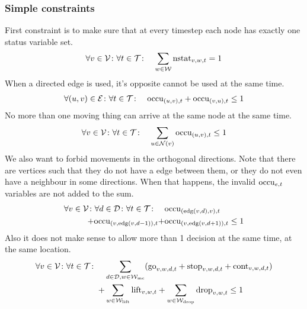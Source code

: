 \subsubsection{Simple constraints}
\label{sec:simple}
First constraint is to make sure that at every timestep each node has exactly
one status variable set.
\begin{align}
    &\forall v \in \mathcal{V} \colon \forall t \in \mathcal{T} \colon & \sum_{w \in \mathcal{W}}
    \mathrm{nstat}_{v,w,t} = 1
\end{align}
When a directed edge is used, it's opposite cannot be used at the same time.
\begin{align}
    &\forall (u,v) \in \mathcal{E} \colon \forall t \in \mathcal{T} \colon & \mathrm{occu}_{(u,v),t} +
    \mathrm{occu}_{(v,u),t} \leq 1
\end{align}
No more than one moving thing can arrive at the same node at the same time.
\begin{align}
    &\forall v \in \mathcal{V} \colon \forall t \in \mathcal{T} \colon & \sum_{u \in \mathcal{N}(v)}
    \mathrm{occu}_{(u,v),t} \leq 1
\end{align}
We also want to forbid movements in the orthogonal directions.  Note that there
are vertices such that they do not have a edge between them, or they do
not even have a neighbour in some directions. When that happens, the invalid
$\mathrm{occu}_{e,t}$ variables are not added to the sum.
\begin{equation}
    \begin{split}
        \forall v \in \mathcal{V} \colon \forall d \in \mathcal{D} \colon \forall t \in \mathcal{T} \colon
        \quad & \mathrm{occu}_{(\mathrm{edg}(v,d),v),t} \\ + \mathrm{occu}_{(v,\mathrm{edg}(v,d-1)),t} + &
        \mathrm{occu}_{(v,\mathrm{edg}(v,d+1)),t} \leq 1
    \end{split}
\end{equation}
Also it does not make sense to allow more than 1 decision at the same time, at
the same location.
\begin{equation}
    \begin{split}
        \forall v \in \mathcal{V} \colon \forall t \in \mathcal{T} \colon \quad & \sum_{d \in \mathcal{D},
        w \in \mathcal{W}_\mathrm{mc}}(\mathrm{go}_{v,w,d,t} + \mathrm{stop}_{v,w,d,t} + \mathrm{cont}_{v,w,d,t}) \\ + &
        \sum_{w \in \mathcal{W}_\mathrm{lift}} \mathrm{lift}_{v,w,t} + \sum_{w \in \mathcal{W}_\mathrm{drop}} \mathrm{drop}_{v,w,t} \leq 1
    \end{split}
\end{equation}

